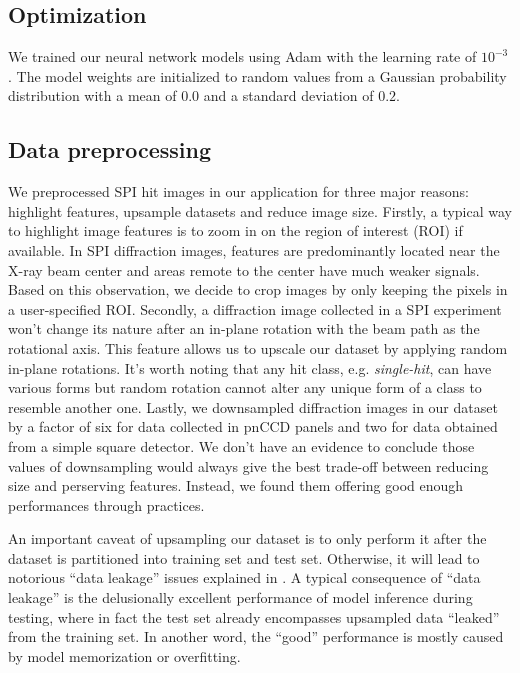 \subsection{Optimization}


We trained our neural network models using Adam
\cite{kingmaAdamMethodStochastic2017} with the learning rate of $10^{-3}$.  The
model weights are initialized to random values from a Gaussian probability
distribution with a mean of $0.0$ and a standard deviation of $0.2$.  

\subsection{Data preprocessing}

We preprocessed SPI hit images in our application for three major reasons:
highlight features, upsample datasets and reduce image size.  Firstly, a typical
way to highlight image features is to zoom in on the region of interest (ROI) if
available.  In SPI diffraction images, features are predominantly located near
the X-ray beam center and areas remote to the center have much weaker signals.
Based on this observation, we decide to crop images by only keeping the pixels
in a user-specified ROI.  Secondly, a diffraction image collected in a SPI
experiment won't change its nature after an in-plane rotation with the beam path
as the rotational axis.  This feature allows us to upscale our dataset by
applying random in-plane rotations.  It's worth noting that any hit class, e.g.
\textit{single-hit}, can have various forms but random rotation cannot alter any
unique form of a class to resemble another one.  Lastly, we downsampled
diffraction images in our dataset by a factor of six for data collected in pnCCD
panels and two for data obtained from a simple square detector.  We don't have
an evidence to conclude those values of downsampling would always give the best
trade-off between reducing size and perserving features.  Instead, we found them
offering good enough performances through practices.  

An important caveat of upsampling our dataset is to only perform it after the
dataset is partitioned into training set and test set.  Otherwise, it will lead
to notorious ``data leakage'' issues explained in
\cite{kapoorLeakageReproducibilityCrisis2022}.  A typical consequence of ``data
leakage'' is the delusionally excellent performance of model inference during
testing, where in fact the test set already encompasses upsampled data
``leaked'' from the training set.  In another word, the ``good'' performance is
mostly caused by model memorization or overfitting.  


